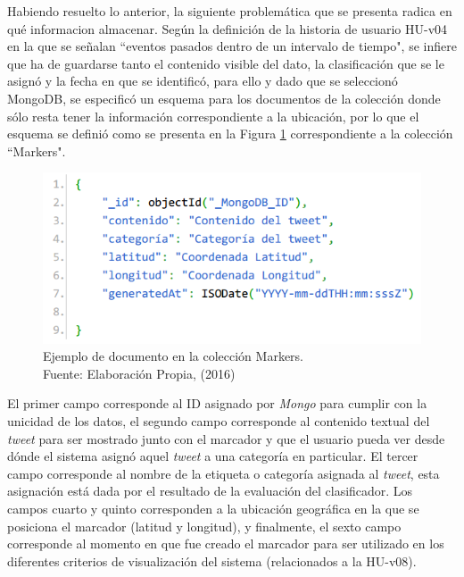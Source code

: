 Habiendo resuelto lo anterior, la siguiente problemática que se presenta radica en qué informacion almacenar. Según la definición de la historia de usuario HU-v04 en la que se señalan ``eventos pasados dentro de un intervalo de tiempo", se infiere que ha de guardarse tanto el contenido visible del dato, la clasificación que se le asignó y la fecha en que se identificó, para ello y dado que se seleccionó MongoDB, se especificó un esquema para los documentos de la colección donde sólo resta tener la información correspondiente a la ubicación, por lo que el esquema se definió como se presenta en la Figura \ref{fig:esquemaMarker1} correspondiente a la colección ``Markers".

\begin{figure}[H]
	\centering
	\captionsetup{justification=centering}
	\includegraphics[scale=0.8]{images/Marker1.png}
	\caption[Ejemplo de documento en la colección Markers.]{Ejemplo de documento en la colección Markers.\\Fuente: Elaboración Propia, (2016)}
	\label{fig:esquemaMarker1}
\end{figure}

El primer campo corresponde al ID asignado por \textit{Mongo} para cumplir con la unicidad de los datos, el segundo campo corresponde al contenido textual del \textit{tweet} para ser mostrado junto con el marcador y que el usuario pueda ver desde dónde el sistema asignó aquel \textit{tweet} a una categoría en particular. El tercer campo corresponde al nombre de la etiqueta o categoría asignada al \textit{tweet}, esta asignación está dada por el resultado de la evaluación del clasificador. Los campos cuarto y quinto corresponden a la ubicación geográfica en la que se posiciona el marcador (latitud y longitud), y finalmente, el sexto campo corresponde al momento en que fue creado el marcador para ser utilizado en los diferentes criterios de visualización del sistema (relacionados a la HU-v08).


